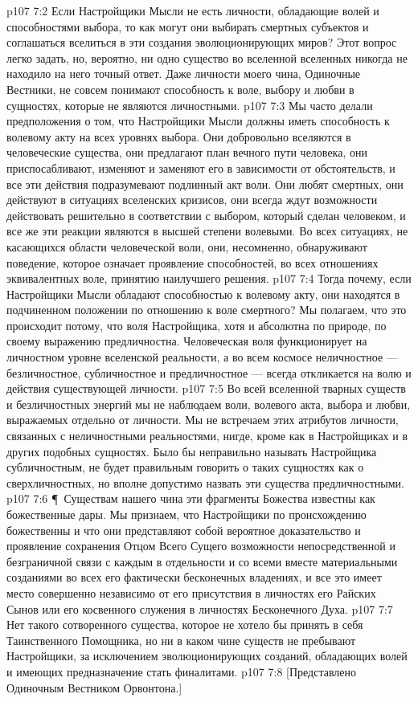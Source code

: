 \vs p107 7:2 Если Настройщики Мысли не есть личности, обладающие волей и способностями выбора, то как могут они выбирать смертных субъектов и соглашаться вселиться в эти создания эволюционирующих миров? Этот вопрос легко задать, но, вероятно, ни одно существо во вселенной вселенных никогда не находило на него точный ответ. Даже личности моего чина, Одиночные Вестники, не совсем понимают способность к воле, выбору и любви в сущностях, которые не являются личностными.
\vs p107 7:3 Мы часто делали предположения о том, что Настройщики Мысли должны иметь способность к волевому акту на всех  уровнях выбора. Они добровольно вселяются в человеческие существа, они предлагают план вечного пути человека, они приспосабливают, изменяют и заменяют его в зависимости от обстоятельств, и все эти действия подразумевают подлинный акт воли. Они любят смертных, они действуют в ситуациях вселенских кризисов, они всегда ждут возможности действовать решительно в соответствии с выбором, который сделан человеком, и все же эти реакции являются в высшей степени волевыми. Во всех ситуациях, не касающихся области человеческой воли, они, несомненно, обнаруживают поведение, которое означает проявление способностей, во всех отношениях эквивалентных воле, принятию наилучшего решения.
\vs p107 7:4 Тогда почему, если Настройщики Мысли обладают способностью к волевому акту, они находятся в подчиненном положении по отношению к воле смертного? Мы полагаем, что это происходит потому, что воля Настройщика, хотя и абсолютна по природе, по своему выражению предличностна. Человеческая воля функционирует на личностном уровне вселенской реальности, а во всем космосе неличностное --- безличностное, субличностное и предличностное --- всегда откликается на волю и действия существующей личности.
\vs p107 7:5 Во всей вселенной тварных существ и безличностных энергий мы не наблюдаем воли, волевого акта, выбора и любви, выражаемых отдельно от личности. Мы не встречаем этих атрибутов личности, связанных с неличностными реальностями, нигде, кроме как в Настройщиках и в других подобных сущностях. Было бы неправильно называть Настройщика субличностным, не будет правильным говорить о таких сущностях как о сверхличностных, но вполне допустимо назвать эти существа предличностными.
\vs p107 7:6 \P\ Существам нашего чина эти фрагменты Божества известны как божественные дары. Мы признаем, что Настройщики по происхождению божественны и что они представляют собой вероятное доказательство и проявление сохранения Отцом Всего Сущего возможности непосредственной и безграничной связи с каждым в отдельности и со всеми вместе материальными созданиями во всех его фактически бесконечных владениях, и все это имеет место совершенно независимо от его присутствия в личностях его Райских Сынов или его косвенного служения в личностях Бесконечного Духа.
\vs p107 7:7 Нет такого сотворенного существа, которое не хотело бы принять в себя Таинственного Помощника, но ни в каком чине существ не пребывают Настройщики, за исключением эволюционирующих созданий, обладающих волей и имеющих предназначение стать финалитами.
\vs p107 7:8 [Представлено Одиночным Вестником Орвонтона.]
